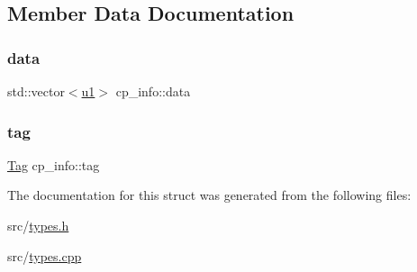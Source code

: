 \subsection{Member Data Documentation}
\mbox{\label{structcp__info_aca6cdfc0ccd687b71c824415258bc870}} 
\subsubsection{\texorpdfstring{data}{data}}
{\footnotesize\ttfamily std\+::vector$<$\hyperlink{types_8h_a162f47a77ee24f6f77cd8c82ccd40ab7}{u1}$>$ cp\+\_\+info\+::data}

\mbox{\label{structcp__info_a9d61bf7aad6935bfe368e4ec509af6ec}} 
\subsubsection{\texorpdfstring{tag}{tag}}
{\footnotesize\ttfamily \hyperlink{structcp__info_acdef8472ed83e12e3a87bca8d6001f69}{Tag} cp\+\_\+info\+::tag}



The documentation for this struct was generated from the following files\+:\begin{DoxyCompactItemize}
\item 
src/\hyperlink{types_8h}{types.\+h}\item 
src/\hyperlink{types_8cpp}{types.\+cpp}\end{DoxyCompactItemize}
